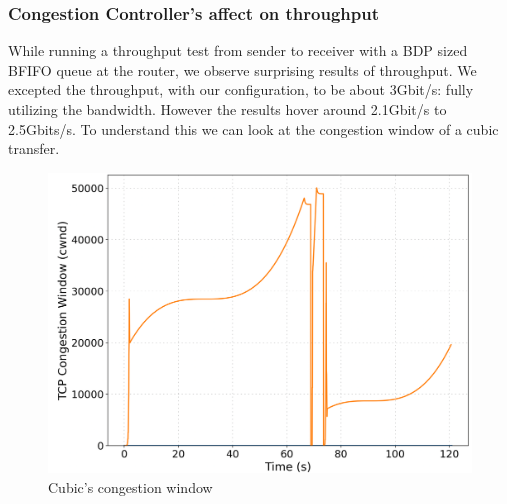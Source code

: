 \documentclass[a4paper,english, 12pt]{report}
\begin{document}

\subsubsection{Congestion Controller's affect on throughput}
While running a throughput test from sender to receiver with a BDP sized BFIFO queue at the router, we observe surprising results of throughput. We excepted the throughput, with our configuration, to be about 3Gbit/s: fully utilizing the bandwidth. However the results hover around 2.1Gbit/s to 2.5Gbits/s. To understand this we can look at the congestion window of a cubic transfer.\\

\begin{figure}[!h!] %
	\centering
	\includegraphics[scale=0.25]{../diagrams/witestlab/cubicwnd.png}
  	\caption{Cubic's congestion window}
  	\label{fig:cubiccwnd}
\end{figure}
\end{document}
